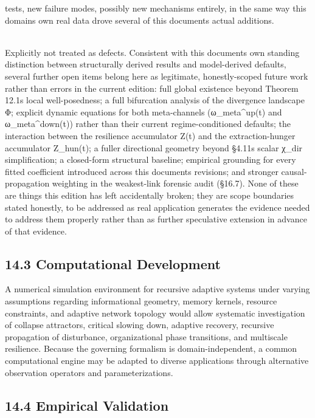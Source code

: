 \documentclass[
]{article}
\begin{document}
tests, new failure modes, possibly new mechanisms entirely, in the same
way this domain\textquotesingle s own real data drove several of this
document\textquotesingle s actual additions.\\
\strut \\
Explicitly not treated as defects. Consistent with this
document\textquotesingle s own standing distinction between structurally
derived results and model-derived defaults, several further open items
belong here as legitimate, honestly-scoped future work rather than
errors in the current edition: full global existence beyond Theorem
12.1\textquotesingle s local well-posedness; a full bifurcation analysis
of the divergence landscape Φ; explicit dynamic equations for both
meta-channels (ω\_meta\^{}up(t) and ω\_meta\^{}down(t)) rather than
their current regime-conditioned defaults; the interaction between the
resilience accumulator Z(t) and the extraction-hunger accumulator
Z\_hun(t); a fuller directional geometry beyond §4.11\textquotesingle s
scalar χ\_dir simplification; a closed-form structural baseline;
empirical grounding for every fitted coefficient introduced across this
document\textquotesingle s revisions; and stronger causal-propagation
weighting in the weakest-link forensic audit (§16.7). None of these are
things this edition has left accidentally broken; they are scope
boundaries stated honestly, to be addressed as real application
generates the evidence needed to address them properly rather than as
further speculative extension in advance of that evidence.

\hypertarget{computational-development}{%
\subsection{14.3 Computational
Development}\label{computational-development}}

A numerical simulation environment for recursive adaptive systems under
varying assumptions regarding informational geometry, memory kernels,
resource constraints, and adaptive network topology would allow
systematic investigation of collapse attractors, critical slowing down,
adaptive recovery, recursive propagation of disturbance, organizational
phase transitions, and multiscale resilience. Because the governing
formalism is domain-independent, a common computational engine may be
adapted to diverse applications through alternative observation
operators and parameterizations.

\hypertarget{empirical-validation}{%
\subsection{14.4 Empirical Validation}\label{empirical-validation}}
\end{document}
